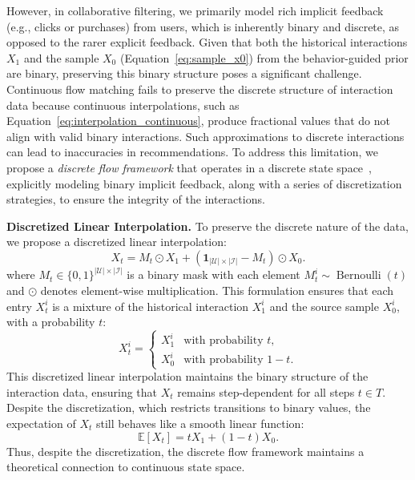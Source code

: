 \documentclass[sigconf]{acmart}
\begin{document}
However, in collaborative filtering, we primarily model rich implicit feedback (e.g., clicks or purchases) from users, which is inherently binary and discrete, as opposed to the rarer explicit feedback. Given that both the historical interactions $X_1$ and the sample $X_0$ (Equation~\ref{eq:sample_x0}) from the behavior-guided prior are binary, preserving this binary structure poses a significant challenge.
Continuous flow matching fails to preserve the discrete structure of interaction data because continuous interpolations, such as Equation~\ref{eq:interpolation_continuous}, produce fractional values that do not align with valid binary interactions. Such approximations to discrete interactions can lead to inaccuracies in recommendations. 
To address this limitation, we propose a \textit{discrete flow framework} that operates in a discrete state space~\cite{campbell2024generative, gat2024discrete}, explicitly modeling binary implicit feedback, along with a series of discretization strategies, to ensure the integrity of the interactions.

\vspace{3pt}
\noindent \textbf{Discretized Linear Interpolation.}
To preserve the discrete nature of the data, we propose a discretized linear interpolation:
\begin{equation}
\label{eq:interpolation_discrete}
X_t=M_t \odot X_1 + (\mathbf 1_{|\mathcal U| \times |\mathcal I|} - M_t) \odot X_0.
\end{equation}
where $M_t \in \{0, 1\}^{|\mathcal U| \times |\mathcal I|}$ is a binary mask with each element $M_t^i \sim \operatorname{Bernoulli}(t)$ and $\odot$ denotes element-wise multiplication. This formulation ensures that each entry $X_t^i$ is a mixture of the historical interaction $X_1^i$ and the source sample $X_0^i$, with a probability $t$:
\begin{equation}
X_t^i= 
\begin{cases}
X_1^i & \text{with probability } t, \\
X_0^i & \text{with probability } 1-t.
\end{cases}
\end{equation}
This discretized linear interpolation maintains the binary structure of the interaction data, ensuring that $X_t$ remains step-dependent for all steps $t \in T$. Despite the discretization, which restricts transitions to binary values, the expectation of $X_t$ still behaves like a smooth linear function:
\begin{equation}
    \label{eq:expectation}
    \mathbb E[X_t] = t X_1 + (1 - t) X_0.
\end{equation}
Thus, despite the discretization, the discrete flow framework maintains a theoretical connection to continuous state space.
\end{document}

